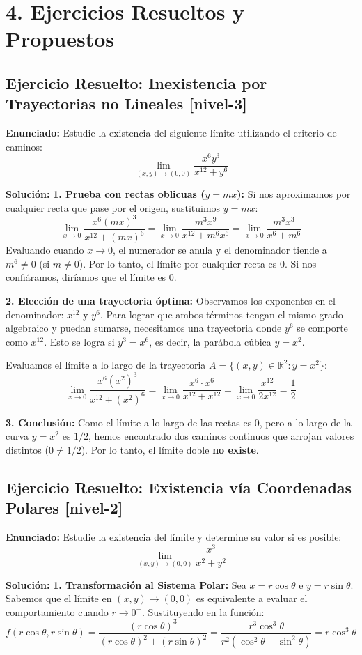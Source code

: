 \documentclass[11pt]{article}
\newenvironment{ejercicios}{%
  \section*{4. Ejercicios Resueltos y Propuestos}%
}{}
\newenvironment{ejercicioresuelto}[2]{\subsection*{Ejercicio Resuelto: #1 \small{[#2]}}}{}
\newcommand{\enunciado}[1]{\textbf{Enunciado:} #1\par\vspace{0.2cm}}
\newcommand{\solucion}[1]{\textbf{Solución:} #1\par\vspace{0.4cm}}
\begin{document}
\begin{ejercicios}

  \begin{ejercicioresuelto}{Inexistencia por Trayectorias no Lineales}{nivel-3}
    \enunciado{
      Estudie la existencia del siguiente límite utilizando el criterio de caminos:
      $$ \displaystyle\lim_{(x,y) \to (0,0)} \dfrac{x^6 y^3}{x^{12} + y^6} $$
    }
    \solucion{
      \textbf{1. Prueba con rectas oblicuas ($y = mx$):}
      Si nos aproximamos por cualquier recta que pase por el origen, sustituimos $y = mx$:
      $$ \displaystyle\lim_{x \to 0} \dfrac{x^6 (mx)^3}{x^{12} + (mx)^6} = \displaystyle\lim_{x \to 0} \dfrac{m^3 x^9}{x^{12} + m^6 x^6} = \displaystyle\lim_{x \to 0} \dfrac{m^3 x^3}{x^6 + m^6} $$
      Evaluando cuando $x \to 0$, el numerador se anula y el denominador tiende a $m^6 \neq 0$ (si $m \neq 0$). Por lo tanto, el límite por cualquier recta es $0$. Si nos confiáramos, diríamos que el límite es $0$.

      \textbf{2. Elección de una trayectoria óptima:}
      Observamos los exponentes en el denominador: $x^{12}$ y $y^6$. Para lograr que ambos términos tengan el mismo grado algebraico y puedan sumarse, necesitamos una trayectoria donde $y^6$ se comporte como $x^{12}$. Esto se logra si $y^3 = x^6$, es decir, la parábola cúbica $y = x^2$.
      
      Evaluamos el límite a lo largo de la trayectoria $A = \{ (x,y) \in \mathbb{R}^2 \colon y = x^2 \}$:
      $$ \displaystyle\lim_{x \to 0} \dfrac{x^6 (x^2)^3}{x^{12} + (x^2)^6} = \displaystyle\lim_{x \to 0} \dfrac{x^6 \cdot x^6}{x^{12} + x^{12}} = \displaystyle\lim_{x \to 0} \dfrac{x^{12}}{2x^{12}} = \dfrac{1}{2} $$

      \textbf{3. Conclusión:}
      Como el límite a lo largo de las rectas es $0$, pero a lo largo de la curva $y = x^2$ es $1/2$, hemos encontrado dos caminos continuos que arrojan valores distintos ($0 \neq 1/2$). Por lo tanto, el límite doble \textbf{no existe}.
    }
  \end{ejercicioresuelto}

  \begin{ejercicioresuelto}{Existencia vía Coordenadas Polares}{nivel-2}
    \enunciado{
      Estudie la existencia del límite y determine su valor si es posible:
      $$ \displaystyle\lim_{(x,y) \to (0,0)} \dfrac{x^3}{x^2 + y^2} $$
    }
    \solucion{
      \textbf{1. Transformación al Sistema Polar:}
      Sea $x = r\cos\theta$ e $y = r\sin\theta$. Sabemos que el límite en $(x,y) \to (0,0)$ es equivalente a evaluar el comportamiento cuando $r \to 0^+$.
      Sustituyendo en la función:
      $$ f(r\cos\theta, r\sin\theta) = \dfrac{(r\cos\theta)^3}{(r\cos\theta)^2 + (r\sin\theta)^2} = \dfrac{r^3\cos^3\theta}{r^2(\cos^2\theta + \sin^2\theta)} = r\cos^3\theta $$

}
\end{ejercicioresuelto}
\end{ejercicios}
\end{document}
